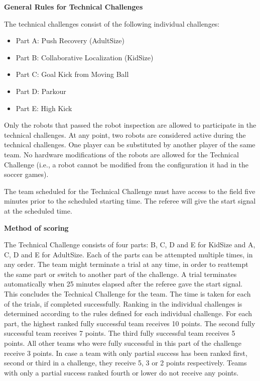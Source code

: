 \clearpage
\sffamily
{\bfseries\color[rgb]{0.4,0.4,0.4}
General Rules for Technical Challenges}
{}

\bigskip

The technical challenges consist of the following individual challenges:

\begin{itemize}
\item Part A: Push Recovery (AdultSize)
\item Part B: Collaborative Localization (KidSize)
\item Part C: Goal Kick from Moving Ball
\item Part D: Parkour
\item Part E: High Kick
\end{itemize}

\bigskip

Only the robots that passed the robot inspection are allowed to participate in the technical challenges.
At any point, two robots are considered active during the technical challenges.
One player can be substituted by another player of the same team.
No hardware modifications of the robots are allowed for the Technical Challenge
(i.e., a robot cannot be modified from the configuration it had in the soccer games). 

\bigskip

The team scheduled for the Technical Challenge must have access to the field five minutes prior to the scheduled starting time. The referee will give the start signal at the scheduled time.

\bigskip

{\bfseries Method of scoring}

\headlinebox
 
The Technical Challenge consists of four parts:
  B, C, D and E for KidSize and
  A, C, D and E for AdultSize.
Each of the parts can be attempted multiple times, in any order.
The team might terminate a trial at any time,
in order to reattempt the same part or switch to another part of the challenge.
A trial terminates automatically when 25 minutes elapsed after the referee gave
the start signal.
This concludes the Technical Challenge for the team.
The time is taken for each of the trials, if completed successfully.
Ranking in the individual challenges is determined according to the rules
defined for each individual challenge.
For each part, the highest ranked fully successful team receives 10 points.
The second fully successful team receives 7 points.
The third fully successful team receives 5 points.
All other teams who were fully successful in this part of the challenge receive 3 points.
In case a team with only partial success has been ranked first, second or third in a challenge, they receive 5, 3 or 2 points respectively.
Teams with only a partial success ranked fourth or lower do not receive any points.

